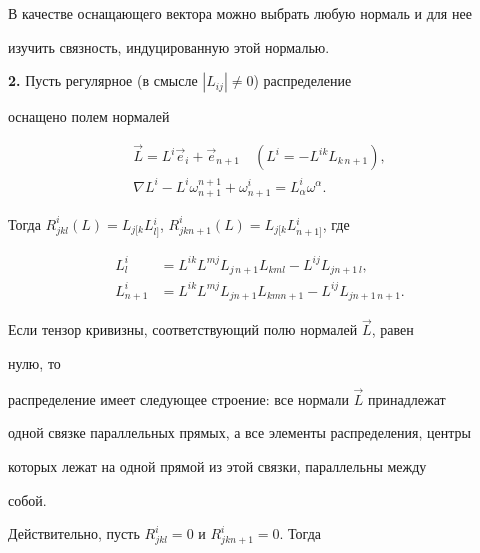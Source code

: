  


В качестве оснащающего вектора можно выбрать любую нормаль и для нее 


изучить связность, индуцированную этой нормалью. 


\medskip 


 


{\bf 2.} Пусть регулярное (в смысле $|L_{i j}|\ne0$) распределение 


оснащено полем нормалей 


\begin{gather*} 


\Vec L=L^i\Vec e_i+\Vec e_{n+1}\quad (L^i=-L^{i k}L_{k\,n+1}),\\ 


\nabla L^i-L^i\omega^{n+1}_{n+1}+\omega^i_{n+1} 


=L^i_\alpha \omega^\alpha. 


\end{gather*} 


Тогда $R^i_{j k l}(L)=L{}_{j[k}L{}^i_{l]}$, $R^i_{j k 


n+1}(L)=L{}_{j[k}L{}^i_{n+1]}$, где 


\begin{align*} 


L^i_l&=L^{i k}L^{m j}L_{j\,n+1}L_{k m l}- 


L^{i j}L_{j n+1\,l},\\ 


L^i_{n+1}&=L^{i k}L^{m j}L_{j n+1}L_{k m n+1}- 


L^{i j}L_{j n+1\,n+1}. 


\end{align*} 


 


Если тензор кривизны, соответствующий полю нормалей $\Vec L$, равен 


нулю, то 


распределение имеет следующее строение: все нормали $\Vec L$ принадлежат 


одной связке параллельных прямых, а все элементы распределения, центры 


которых лежат на одной прямой из этой связки, параллельны между 


собой. 


 


Действительно, пусть $R^i_{j k l}=0$ и $R^i_{j k n+1}=0$. Тогда 


